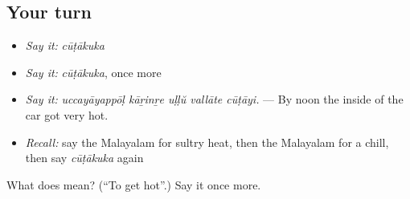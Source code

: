\subsection*{Your turn}
\begin{itemize}
\raggedright
  \item \emph{Say it:} \emph{cūṭākuka}
  \item \emph{Say it:} \emph{cūṭākuka}, once more
  \item \emph{Say it:} \emph{uccayāyappōḷ kāṟinṟe uḷḷŭ vallāte cūṭāyi.} — By noon the inside of the car got very hot.
  \item \emph{Recall:} say the Malayalam for sultry heat, then the Malayalam for a chill, then say \emph{cūṭākuka} again
\end{itemize}

\begin{tcolorbox}[breakable,colback=teal!4,colframe=teal!35!black,title={Before you move on}]
What does  mean? (\textquotedblleft{}To get hot\textquotedblright{}.) Say it once more.
\end{tcolorbox}
